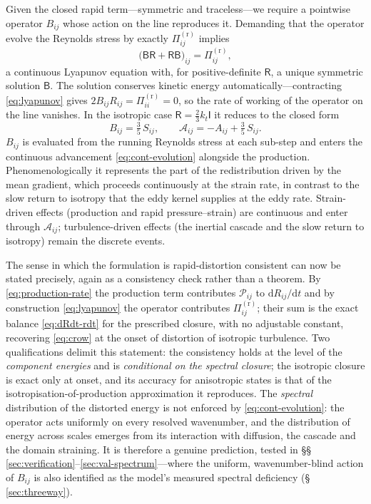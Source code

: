 \documentclass[lineno]{JFM-FLM_Au}
\begin{document}
Given the closed rapid term---symmetric and traceless---we require a
pointwise operator $B_{ij}$ whose action on the line reproduces it.
Demanding that the operator evolve the Reynolds stress by exactly
$\Pi^{(\mathrm r)}_{ij}$ implies
\begin{equation}
  \big(\mathsf{B}\mathsf{R}+\mathsf{R}\mathsf{B}\big)_{ij}
  = \Pi^{(\mathrm r)}_{ij},
  \label{eq:lyapunov}
\end{equation}
a continuous Lyapunov equation with, for positive-definite
$\mathsf{R}$, a unique symmetric solution $\mathsf{B}$. The solution
conserves kinetic energy automatically---contracting \eqref{eq:lyapunov}
gives $2B_{ij}R_{ij}=\Pi^{(\mathrm r)}_{ii}=0$, so the rate of working of
the operator on the line vanishes. In the isotropic case
$\mathsf{R}=\tfrac23k_t\mathsf{I}$ it reduces to the closed form
\begin{equation}
  B_{ij} = \tfrac{3}{5}\,S_{ij},
  \qquad
  \mathcal{A}_{ij} = -A_{ij} + \tfrac{3}{5}\,S_{ij}.
  \label{eq:iso-B}
\end{equation}
$B_{ij}$ is evaluated from the running Reynolds stress at each sub-step
and enters the continuous advancement \eqref{eq:cont-evolution}
alongside the production. Phenomenologically it represents the part of
the redistribution driven by the mean gradient, which proceeds
continuously at the strain rate, in contrast to the slow return to
isotropy that the eddy kernel supplies at the eddy rate. Strain-driven effects (production and
rapid pressure--strain) are continuous and enter through
$\mathcal{A}_{ij}$; turbulence-driven effects (the inertial cascade and
the slow return to isotropy) remain the discrete events.

The sense in which the formulation is rapid-distortion consistent can now
be stated precisely, again as a consistency check rather than a theorem.
By \eqref{eq:production-rate} the production term contributes
$\mathcal{P}_{ij}$ to $\mathrm{d}R_{ij}/\mathrm{d}t$ and by construction
\eqref{eq:lyapunov} the operator contributes $\Pi^{(\mathrm r)}_{ij}$;
their sum is the exact balance \eqref{eq:dRdt-rdt} for the prescribed
closure, with no adjustable constant, recovering \eqref{eq:crow} at the
onset of distortion of isotropic turbulence. Two qualifications delimit
this statement: the consistency holds at the level of the
\emph{component energies} and is \emph{conditional on the
spectral closure}; the isotropic closure is exact only at onset, and its
accuracy for anisotropic states is that of the
isotropisation-of-production approximation it reproduces. The
\emph{spectral} distribution of the distorted energy is not enforced by
\eqref{eq:cont-evolution}: the operator acts uniformly on every resolved
wavenumber, and the distribution of energy across scales emerges from
its interaction with diffusion, the cascade and the domain straining. It
is therefore a genuine prediction, tested in
\S\S\,\ref{sec:verification}--\ref{sec:val-spectrum}---where the
uniform, wavenumber-blind action of $B_{ij}$ is also identified as the
model's measured spectral deficiency (\S\,\ref{sec:threeway}).
\end{document}
